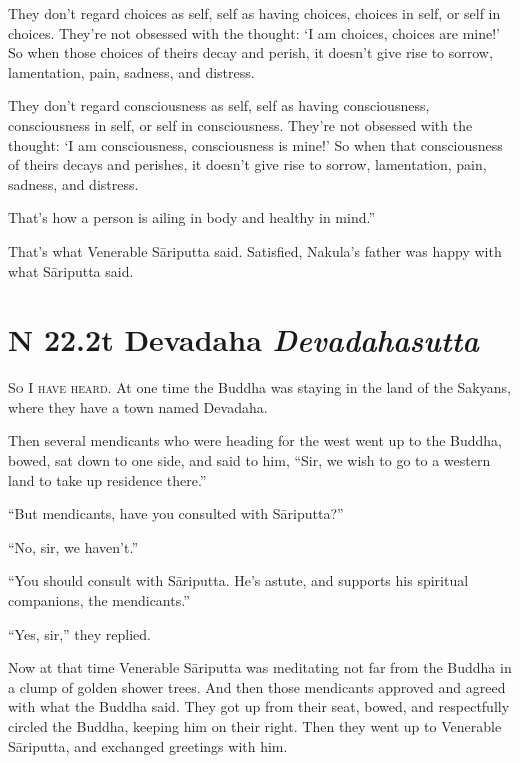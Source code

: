 \documentclass[12pt,openany]{book}%
\newcommand*{\suttatitleacronym}[1]{\smaller[2]{#1}\vspace*{.3em}}
\newcommand*{\suttatitletranslation}[1]{\linebreak{#1}}
\newcommand*{\suttatitleroot}[1]{\linebreak\smaller[2]\itshape{#1}}
\newcommand*{\tocacronym}[1]{\hspace*{-3.3em}{#1}\quad}
\newcommand*{\toctranslation}[1]{#1}
\newcommand*{\tocroot}[1]{(\textit{#1})}
\newcommand*{\scevam}[1]{\textsc{#1}}
\begin{document}
They don’t regard choices as self, self as having choices, choices in self, or self in choices. They’re not obsessed with the thought: ‘I am choices, choices are mine!’ So when those choices of theirs decay and perish, it doesn’t give rise to sorrow, lamentation, pain, sadness, and distress. 

They don’t regard consciousness as self, self as having consciousness, consciousness in self, or self in consciousness. They’re not obsessed with the thought: ‘I am consciousness, consciousness is mine!’ So when that consciousness of theirs decays and perishes, it doesn’t give rise to sorrow, lamentation, pain, sadness, and distress. 

That’s how a person is ailing in body and healthy in mind.” 

That’s what Venerable \textsanskrit{Sāriputta} said. Satisfied, Nakula’s father was happy with what \textsanskrit{Sāriputta} said. 

%
\section*{{\suttatitleacronym SN 22.2}{\suttatitletranslation At Devadaha }{\suttatitleroot Devadahasutta}}
\addcontentsline{toc}{section}{\tocacronym{SN 22.2} \toctranslation{At Devadaha } \tocroot{Devadahasutta}}

\scevam{So I have heard. }At one time the Buddha was staying in the land of the Sakyans, where they have a town named Devadaha. 

Then several mendicants who were heading for the west went up to the Buddha, bowed, sat down to one side, and said to him, “Sir, we wish to go to a western land to take up residence there.” 

“But mendicants, have you consulted with \textsanskrit{Sāriputta}?” 

“No, sir, we haven’t.” 

“You should consult with \textsanskrit{Sāriputta}. He’s astute, and supports his spiritual companions, the mendicants.” 

“Yes, sir,” they replied. 

Now at that time Venerable \textsanskrit{Sāriputta} was meditating not far from the Buddha in a clump of golden shower trees. And then those mendicants approved and agreed with what the Buddha said. They got up from their seat, bowed, and respectfully circled the Buddha, keeping him on their right. Then they went up to Venerable \textsanskrit{Sāriputta}, and exchanged greetings with him. 
\end{document}
